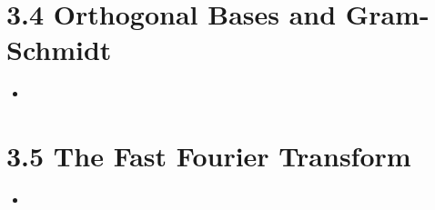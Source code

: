 \section{3.4 Orthogonal Bases and Gram-Schmidt}
\begin{itemize}
  \item []

\end{itemize}

\section{3.5 The Fast Fourier Transform}
\begin{itemize}
  \item []

\end{itemize}
